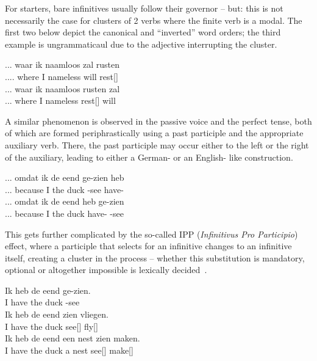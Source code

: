 For starters, bare infinitives usually follow their governor -- but: this is not necessarily the case for clusters of 2 verbs where the finite verb is a modal.
The first two  below depict the canonical and ``inverted'' word orders; the third example is ungrammaticaul due to the adjective  interrupting the cluster.
\begin{exe}
\ex\label{gloss:rusten_zal}
\begin{xlist}
\ex
\gll ... waar ik naamloos zal rusten\\
.... where I nameless will rest[]\\
\ex
\gll ... waar ik naamloos rusten zal\\
... where I nameless rest[] will\\
\end{xlist}
\end{exe}
A similar phenomenon is observed in the passive voice and the perfect tense, both of which are formed periphrastically using a past participle and the appropriate auxiliary verb.
There, the past participle may occur either to the left or the right of the auxiliary, leading to either a German- or an English- like construction.
\begin{exe}
\ex\label{gloss:green_vs_red}
\begin{xlist}
\ex
\gll ... omdat ik de eend ge-zien heb\\
... because I the duck -see have-\\
\ex
\gll ... omdat ik de eend heb ge-zien\\
... because I the duck have- -see\\
\end{xlist}
\end{exe}
This gets further complicated by the so-called IPP (\textit{Infinitivus Pro Participio}) effect, where a participle that selects for an infinitive changes to an infinitive itself, creating a cluster in the process -- whether this substitution is mandatory, optional or altogether impossible is lexically decided~\cite{augustinus2015complement}.
\begin{exe}
\ex\label{gloss:ipp}
\begin{xlist}
\ex 
\gll Ik heb de eend ge-zien.\\
I have the duck -see\\
\ex
\gll Ik heb de eend zien vliegen.\\
I have the duck see[] fly[]\\
\ex\label{gloss:ipp_tv}
\gll Ik heb de eend een nest zien maken.\\
I have the duck a nest see[] make[]\\
\end{xlist}
\end{exe}

